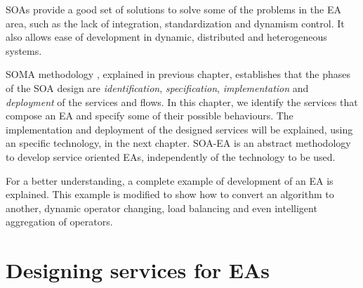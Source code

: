 \label{chap:soaea}
\minitoc\mtcskip
\vfill
\lettrine{S}{OA}s provide a good set of solutions to solve some of the
problems in the EA area, such as the lack of integration,
standardization and dynamism control. It also allows ease of
development in dynamic, distributed and heterogeneous systems. %

SOMA methodology \cite{Arsanjani2008SOMA}, explained in previous chapter, establishes that the phases of the SOA design are {\em identification}, {\em specification}, {\em implementation} and {\em deployment} of the services and flows. In this chapter, we identify the services that compose an EA and specify some of their possible behaviours. The implementation and deployment of the designed services will be explained, using an specific technology, in the next chapter. SOA-EA is an
abstract methodology to develop service oriented EAs, independently
of the technology to be used. 

For a better understanding, a complete example of development of an EA
is explained. This example is modified to show how to convert an
algorithm to another, dynamic operator changing, load balancing and
even intelligent aggregation of operators.






\section{Designing services for EAs}

